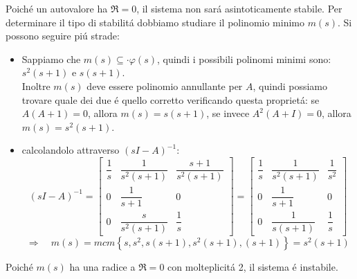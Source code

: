 \begin{mdframed}[style=Exercise]
\begin{Exercise}[title={Studio completo del sistema e stabilizzazione}, difficulty=3]
				Poich\'e un autovalore ha $ \Re = 0 $, il sistema non sar\'a asintoticamente stabile. Per determinare il tipo di stabilit\'a dobbiamo studiare il polinomio minimo $ m(s) $. Si possono seguire pi\'u strade:
				\begin{itemize}
					\item
						Sappiamo che $ m(s) \subseteq\cdot \varphi(s) $, quindi i possibili polinomi minimi sono: $ s^2(s+1) $ e $ s(s+1) $.\\ Inoltre $ m(s) $ deve essere polinomio annullante per $ A $, quindi possiamo trovare quale dei due \'e quello corretto verificando questa propriet\'a: se $ A(A+1) = 0 $, allora $ m(s) = s(s+1) $, se invece $ A^2(A+I) = 0 $, allora $ m(s) = s^2(s+1) $.
					\item
						calcolandolo attraverso $ (sI-A)^{-1} $:
						\[
							(sI-A)^{-1}=
							\begin{bmatrix}
								\dfrac{1}{s} & \dfrac{1}{s^2(s+1)} & \dfrac{s+1}{s^2(s+1)}\\[.5cm]
								0 & \dfrac{1}{s+1} & 0\\[.5cm]
								0 & \dfrac{s}{s^2(s+1)} & \dfrac{1}{s}
							\end{bmatrix} =
							\begin{bmatrix}
								\dfrac{1}{s} & \dfrac{1}{s^2(s+1)} & \dfrac{1}{s^2}\\[.5cm]
								0 & \dfrac{1}{s+1} & 0\\[.5cm]
								0 & \dfrac{1}{s(s+1)} & \dfrac{1}{s}
							\end{bmatrix}
						\]
						\[ \Rightarrow\quad m(s) = mcm\left\lbrace s, s^2, s(s+1), s^2(s+1), (s+1) \right\rbrace  = s^2(s+1) \]
				\end{itemize}
				Poich\'e $ m(s) $ ha una radice a $ \Re = 0 $ con molteplicit\'a 2, il sistema \'e instabile.
				

\end{Exercise}
\end{mdframed}
